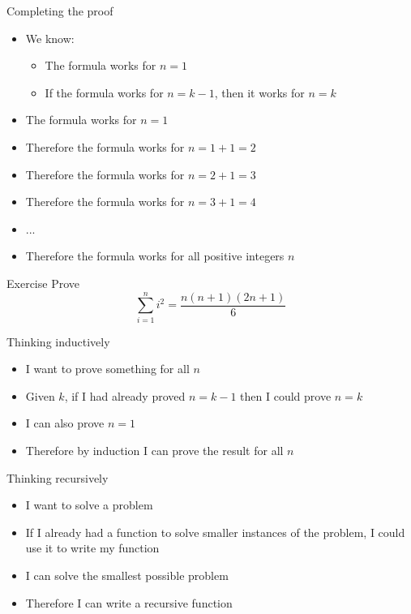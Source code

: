 \begin{frame}{Completing the proof}
	\begin{itemize}
		\pause\item We know:
			\begin{itemize}
				\pause\item The formula works for $n=1$
				\pause\item If the formula works for $n=k-1$, then it works for $n=k$
			\end{itemize}
		\pause\item The formula works for $n=1$
		\pause\item Therefore the formula works for $n=1+1=2$
		\pause\item Therefore the formula works for $n=2+1=3$
		\pause\item Therefore the formula works for $n=3+1=4$
		\pause\item ...
		\pause\item Therefore the formula works for all positive integers $n$
	\end{itemize}
\end{frame}

\begin{frame}{Exercise}
	Prove
	$$ \sum_{i=1}^n i^2 = \frac{n(n+1)(2n+1)}{6} $$
\end{frame}

\begin{frame}{Thinking inductively}
	\begin{itemize}
		\pause\item I want to prove something for all $n$
		\pause\item Given $k$, if I had already proved $n=k-1$ then I could prove $n=k$
		\pause\item I can also prove $n=1$
		\pause\item Therefore by induction I can prove the result for all $n$
	\end{itemize}
\end{frame}

\begin{frame}{Thinking recursively}
	\begin{itemize}
		\pause\item I want to solve a problem
		\pause\item If I already had a function to solve smaller instances of the problem, I could use it
			to write my function
		\pause\item I can solve the smallest possible problem
		\pause\item Therefore I can write a recursive function
	\end{itemize}
\end{frame}

